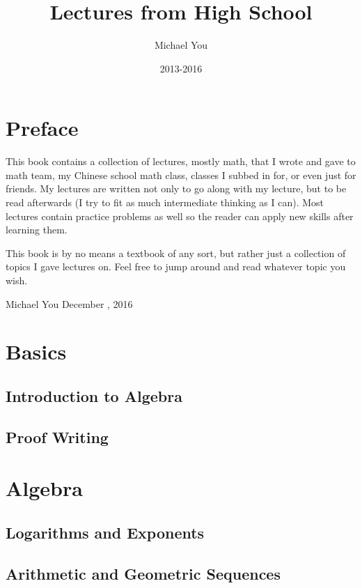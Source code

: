 \documentclass{book}
\title{Lectures from High School}
\author{Michael You}
\date{2013-2016}
\begin{document}
\maketitle

\chapter*{Preface}
This book contains a collection of lectures, mostly math, that I wrote and gave to math team, my Chinese school math class, classes I subbed in for, or even just for friends. My lectures are written not only to go along with my lecture, but to be read afterwards (I try to fit as much intermediate thinking as I can). Most lectures contain practice problems as well so the reader can apply new skills after learning them.

This book is by no means a textbook of any sort, but rather just a collection of topics I gave lectures on. Feel free to jump around and read whatever topic you wish.

\vspace{0.5in}
\noindent Michael You
\noindent December , 2016

\tableofcontents

\chapter{Basics}
\section{Introduction to Algebra}

\newpage

\section{Proof Writing}


\chapter{Algebra}
\section{Logarithms and Exponents}


\section{Arithmetic and Geometric Sequences}

\end{document}
